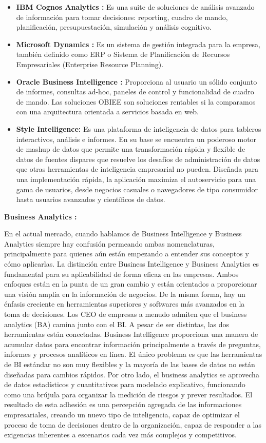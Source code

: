 \documentclass[%
 reprint,
 amsmath,amssymb,
 aps,
]{revtex4-1}
\begin{document}
\begin{itemize}
\item \textbf{IBM Cognos Analytics :}
Es una suite de soluciones de análisis avanzado de información para tomar decisiones: reporting, cuadro de mando, planificación, presupuestación, simulación y análisis cognitivo.
\item \textbf{Microsoft Dynamics :}
Es un sistema de gestión integrada para la empresa, también definido como ERP o Sistema de Planificación de Recursos Empresariales (Enterprise Resource Planning).
\item \textbf{Oracle Business Intelligence :}
Proporciona al usuario un sólido conjunto de informes, consultas ad-hoc, paneles de control y funcionalidad de cuadro de mando. Las soluciones OBIEE son soluciones rentables si la comparamos con una arquitectura orientada a servicios basada en web.
\item \textbf{Style Intelligence:}
Es una plataforma de inteligencia de datos para tableros interactivos, análisis e informes. En su base se encuentra un poderoso motor de mashup de datos que permite una transformación rápida y flexible de datos de fuentes dispares que resuelve los desafíos de administración de datos que otras herramientas de inteligencia empresarial no pueden. Diseñada para una implementación rápida, la aplicación maximiza el autoservicio para una gama de usuarios, desde negocios casuales o navegadores de tipo consumidor hasta usuarios avanzados y científicos de datos.

	\end{itemize} 

\textbf {Business Analytics :}

En el actual mercado, cuando hablamos de Business Intelligence y Business Analytics siempre hay confusión permeando ambas nomenclaturas, principalmente para quienes aún están empezando a entender sus conceptos y cómo aplicarlas. La distinción entre Business Intelligence y Business Analytics es fundamental para su aplicabilidad de forma eficaz en las empresas.
Ambos enfoques están en la punta de un gran cambio y están orientados a proporcionar una visión amplia en la información de negocios. De la misma forma, hay un énfasis creciente en herramientas superiores y softwares más avanzados en la toma de decisiones. Los CEO de empresas a menudo admiten que el business analytics (BA) camina junto con el BI.
A pesar de ser distintas, las dos herramientas están conectadas. Business Intelligence proporciona una manera de acumular datos para encontrar información principalmente a través de preguntas, informes y procesos analíticos en línea. El único problema es que las herramientas de BI estándar no son muy flexibles y la mayoría de las bases de datos no están diseñadas para cambios rápidos.
Por otro lado, el business analytics se aprovecha de datos estadísticos y cuantitativos para modelado explicativo, funcionando como una brújula para organizar la medición de riesgos y prever resultados. El resultado de esta adhesión es una percepción agregada de las informaciones empresariales, creando un nuevo tipo de inteligencia, capaz de optimizar el proceso de toma de decisiones dentro de la organización, capaz de responder a las exigencias inherentes a escenarios cada vez más complejos y competitivos.
\end{document}
